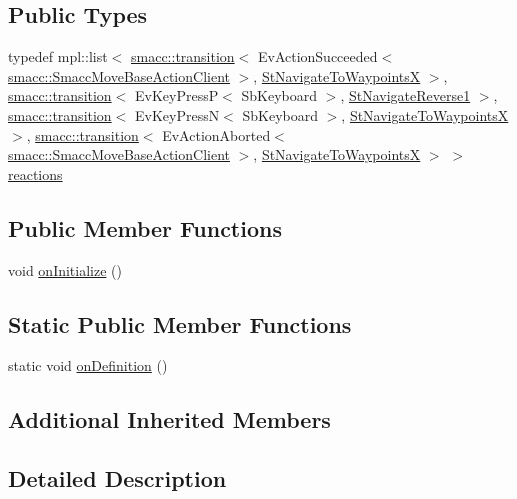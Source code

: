 \subsection*{Public Types}
\begin{DoxyCompactItemize}
\item 
typedef mpl\+::list$<$ \hyperlink{classsmacc_1_1transition}{smacc\+::transition}$<$ Ev\+Action\+Succeeded$<$ \hyperlink{classsmacc_1_1SmaccMoveBaseActionClient}{smacc\+::\+Smacc\+Move\+Base\+Action\+Client} $>$, \hyperlink{structStNavigateToWaypointsX}{St\+Navigate\+To\+WaypointsX} $>$, \hyperlink{classsmacc_1_1transition}{smacc\+::transition}$<$ Ev\+Key\+PressP$<$ Sb\+Keyboard $>$, \hyperlink{structStNavigateReverse1}{St\+Navigate\+Reverse1} $>$, \hyperlink{classsmacc_1_1transition}{smacc\+::transition}$<$ Ev\+Key\+PressN$<$ Sb\+Keyboard $>$, \hyperlink{structStNavigateToWaypointsX}{St\+Navigate\+To\+WaypointsX} $>$, \hyperlink{classsmacc_1_1transition}{smacc\+::transition}$<$ Ev\+Action\+Aborted$<$ \hyperlink{classsmacc_1_1SmaccMoveBaseActionClient}{smacc\+::\+Smacc\+Move\+Base\+Action\+Client} $>$, \hyperlink{structStNavigateToWaypointsX}{St\+Navigate\+To\+WaypointsX} $>$ $>$ \hyperlink{structStRotateDegrees3_a8996c3ac620bbf8ba1b48f17e298b8ea}{reactions}
\end{DoxyCompactItemize}
\subsection*{Public Member Functions}
\begin{DoxyCompactItemize}
\item 
void \hyperlink{structStRotateDegrees3_a9a69cfa8a8193207068ae828ee0f6c97}{on\+Initialize} ()
\end{DoxyCompactItemize}
\subsection*{Static Public Member Functions}
\begin{DoxyCompactItemize}
\item 
static void \hyperlink{structStRotateDegrees3_a5b8c80e7b209c2d83ce9711d73d636e7}{on\+Definition} ()
\end{DoxyCompactItemize}
\subsection*{Additional Inherited Members}


\subsection{Detailed Description}


